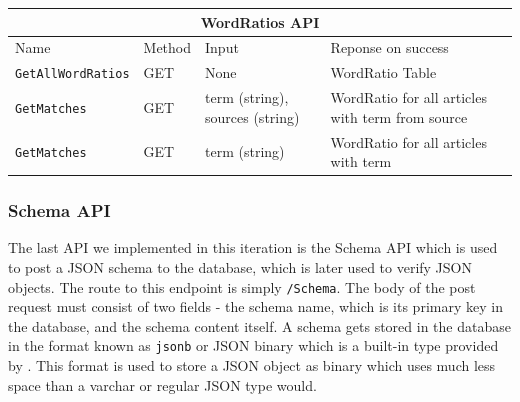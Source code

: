 \begin{table}[]
\begin{tabular}{|llll|}
\hline
\multicolumn{4}{|c|}{\textbf{WordRatios API}}                                                                                                                                           \\ \hline
\multicolumn{1}{|l|}{Name}                      & \multicolumn{1}{l|}{Method} & \multicolumn{1}{l|}{Input}                           & Reponse on success                               \\ \hline
\multicolumn{1}{|l|}{\texttt{GetAllWordRatios}} & \multicolumn{1}{l|}{GET}    & \multicolumn{1}{l|}{None}                            & WordRatio Table                                  \\ \hline
\multicolumn{1}{|l|}{\texttt{GetMatches}}       & \multicolumn{1}{l|}{GET}    & \multicolumn{1}{l|}{term (string), sources (string)} & WordRatio for all articles with term from source \\ \hline
\multicolumn{1}{|l|}{\texttt{GetMatches}}       & \multicolumn{1}{l|}{GET}    & \multicolumn{1}{l|}{term (string)}                   & WordRatio for all articles with term             \\ \hline
\end{tabular}
\end{table}

\subsubsection{Schema API}

The last API we implemented in this iteration is the Schema API which is used to post a JSON schema to the database, which is later used to verify JSON objects.
The route to this endpoint is simply \texttt{/Schema}. 
The body of the post request must consist of two fields - the schema name, which is its primary key in the database, and the schema content itself. 
A schema gets stored in the database in the format known as \texttt{jsonb} or JSON binary which is a built-in type provided by \postgres{}.
This format is used to store a JSON object as binary which uses much less space than a varchar or regular JSON type would.


